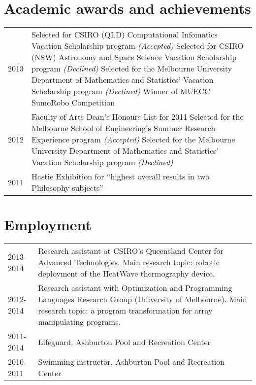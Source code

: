 \documentclass[12pt,a4paper]{article}
\newenvironment{llist}
	{\renewcommand{\arraystretch}{1.5}\begin{tabular}{p{3cm} p{12cm}}}
	{\end{tabular}}
\begin{document}
\section*{Academic awards and achievements}
\begin{llist}
  2013 & Selected for CSIRO (QLD) Computational Infomatics Vacation Scholarship
         program \textit{(Accepted)} \newline \newline
         Selected for CSIRO (NSW) Astronomy and Space Science Vacation
         Scholarship program \textit{(Declined)}\newline \newline
         Selected for the Melbourne University Department of Mathematics and
         Statistics' Vacation Scholarship program \textit{(Declined)} \newline \newline
         Winner of MUECC SumoRobo Competition \\
	2012 & Faculty of Arts Dean's Honours List for 2011 \newline \newline
         Selected for the Melbourne School of Engineering's Summer Research
         Experience program \textit{(Accepted)} \newline \newline
         Selected for the Melbourne University Department of Mathematics and
         Statistics' Vacation Scholarship program \textit{(Declined)} \\
	2011 & Hastie Exhibition for ``highest overall results in two Philosophy subjects''
\end{llist}

\section*{Employment}
\begin{llist}
  2013-2014 & Research assistant at CSIRO's Queensland Center for Advanced
  Technologies. Main research topic: robotic deployment of the HeatWave
  thermography device. \\
  2012-2014 & Research assistant with Optimization and Programming Languages
  Research Group (University of Melbourne). Main research topic: a program
  transformation for array manipulating programs. \\
	2011-2014 & Lifeguard, Ashburton Pool and Recreation Center \\
	2010-2011 & Swimming instructor, Ashburton Pool and Recreation Center \\
\end{llist}
\end{document}
